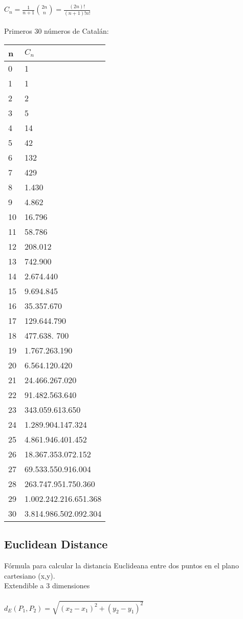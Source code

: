 \documentclass[11pt,letterpaper,twocolumn,twosided]{article}
\begin{document}
{\LARGE $C_{n} = \frac{1}{n+1}\binom{2n}{n} = \frac{(2n)!}{(n+1)!n!}$}\\ \\
Primeros 30 n\'umeros de Catal\'an:\\
\begin{tabular}{|l|l|}
\hline
n & $C_{n}$ \\ \hline
0 & 1 \\ \hline
1 & 1 \\ \hline
2 & 2 \\ \hline
3 & 5 \\ \hline
4 & 14 \\ \hline
5 & 42 \\ \hline
6 & 132 \\ \hline
7 & 429 \\ \hline
8 & 1.430\\ \hline
9 & 4.862\\ \hline
10 & 16.796\\ \hline
11 & 58.786\\ \hline
12 & 208.012\\ \hline
13 & 742.900\\ \hline
14 & 2.674.440\\ \hline
15 & 9.694.845\\ \hline
16 & 35.357.670\\ \hline
17 & 129.644.790\\ \hline
18 & 477.638. 700\\ \hline
19 & 1.767.263.190\\ \hline
20 & 6.564.120.420\\ \hline
21 & 24.466.267.020\\ \hline
22 & 91.482.563.640\\ \hline
23 & 343.059.613.650\\ \hline
24 & 1.289.904.147.324\\ \hline
25 & 4.861.946.401.452\\ \hline
26 & 18.367.353.072.152\\ \hline
27 & 69.533.550.916.004\\ \hline
28 & 263.747.951.750.360\\ \hline
29 & 1.002.242.216.651.368\\ \hline
30 & 3.814.986.502.092.304\\ \hline
\end{tabular}



\subsection{Euclidean Distance}
F\'ormula para calcular la distancia Euclideana entre dos puntos en el plano cartesiano (x,y). \\
Extendible a 3 dimensiones\\ \\
$ d_{E}(P_{1},P_{2}) = \sqrt{(x_{2}-x_{1})^{2}+(y_{2}-y_{1})^{2}} $
\end{document}
